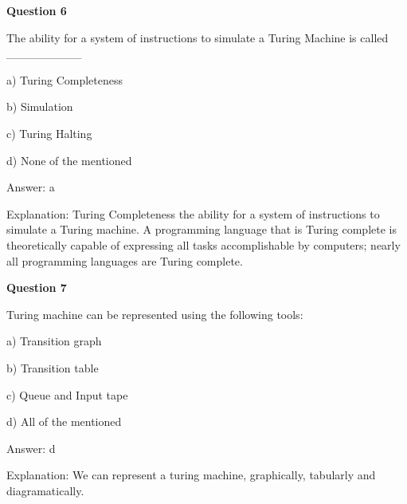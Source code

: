 \documentclass{article}
\begin{document}
\begin{mdframed}[linewidth=1pt, roundcorner=5pt, linecolor=gray!30, backgroundcolor=gray!5]
\textbf{Question 6} 

The ability for a system of instructions to simulate a Turing Machine is called \_\_\_\_\_\_\_\_\_

a) Turing Completeness

b) Simulation

c) Turing Halting

d) None of the mentioned
\vspace{5pt} \par
\begin{tcolorbox}[colback=green!5, colframe=green!40!black, title=Solution]
Answer: a

Explanation: Turing Completeness the ability for a system of instructions to simulate a Turing machine. A programming language that is Turing complete is theoretically capable of expressing all tasks accomplishable by computers; nearly all programming languages are Turing complete.
\end{tcolorbox}
\end{mdframed}
\newpage

\begin{mdframed}[linewidth=1pt, roundcorner=5pt, linecolor=gray!30, backgroundcolor=gray!5]
\textbf{Question 7} 

Turing machine can be represented using the following tools:

a) Transition graph

b) Transition table

c) Queue and Input tape

d) All of the mentioned
\vspace{5pt} \par
\begin{tcolorbox}[colback=green!5, colframe=green!40!black, title=Solution]
Answer: d

Explanation: We can represent a turing machine, graphically, tabularly and diagramatically.
\end{tcolorbox}
\end{mdframed}
\end{document}
